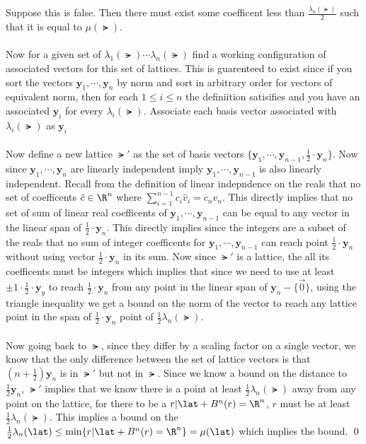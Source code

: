 \documentclass[12pt]{amsart}
\begin{document}
\begin{problem}
    \begin{subproblem}
      Suppose this is false. Then there must exist some coefficent less than $\frac{\lambda_n(\lat)}2$ such that it is equal to $\mu(\lat)$. 
\\\\
      Now for a given set of $\lambda_1(\lat)\cdots \lambda_n(\lat)$ find a working configuration of associated vectors for this set of lattices. This is guarenteed to exist since if you sort the vectors $\mathbf{y}_1,\cdots,\mathbf{y}_n$ by norm and sort in arbitrary order for vectors of equivalent norm, then for each $1\leq i\leq n$ the definiition satisifies and you have an associated $\mathbf{y}_i$ for every $\lambda_i(\lat)$. Associate each basis vector associated with $\lambda_i(\lat)$ as $\mathbf{y}_i$
\\\\
Now define a new lattice $\lat'$ as the set of basis vectors $\{\mathbf{y}_1,\cdots,\mathbf{y}_{n-1}, \frac12\cdot\mathbf{y}_n\}$. Now since $\mathbf{y}_1,\cdots,\mathbf{y}_n$ are linearly independent imply $\mathbf{y}_1,\cdots,\mathbf{y}_{n-1}$ is also linearly independent. Recall from the definition of linear indepndence on the reals that no set of coefficents $\hat c\in\R^n$ where $\sum^{n-1}_{i=1} c_i \hat v_i = c_n v_n$. This directly implies that no set of sum of linear real coefficents of $\mathbf{y}_1,\cdots,\mathbf{y}_{n-1}$ can be equal to any vector in the linear span of $\frac12\cdot \mathbf{y}_n$. This directly implies since the integers are a subset of the reals that no sum of integer coefficents for $\mathbf{y}_1,\cdots,\mathbf{y}_{n-1}$ can reach point $\frac12\cdot\mathbf{y}_n$ without using vector $\frac12\cdot\mathbf{y}_n$ in its sum. Now since $\lat'$ is a lattice, the all its coefficents must be integers which implies that since we need to use at least $\pm 1 \cdot \frac12\cdot\mathbf{y}_y$ to reach $\frac12\cdot\mathbf{y}_n$ from any point in the linear span of $\mathbf{y}_n-\{\vec0\}$, using the triangle inequality we get a bound on the norm of the vector to reach any lattice point in the span of $\frac12\cdot\mathbf{y}_n$ point of $\frac12\lambda_n(\lat)$. 
\\\\
Now going back to $\lat$, since they differ by a scaling factor on a single vector, we know that the only difference between the set of lattice vectors is that $(n+\frac12)\mathbf{y}_n$ is in $\lat'$ but not in $\lat$. Since we know a bound on the distance to $\frac12\mathbf{y}_n$, $\lat'$ implies that we know there is a point at least $\frac12\lambda_n(\lat)$ away from any point on the lattice, for there to be a $r|\lat+B^n(r)=\R^n$, $r$ must be at least $\frac12\lambda_n(\lat)$. This implies a bound on the $\frac12\lambda_n(\lat)\leq\min\{r|\lat+B^n(r)=\R^n\} = \mu(\lat)$ which implies the bound. \qed
    \end{subproblem}
  \end{problem}
\end{document}
